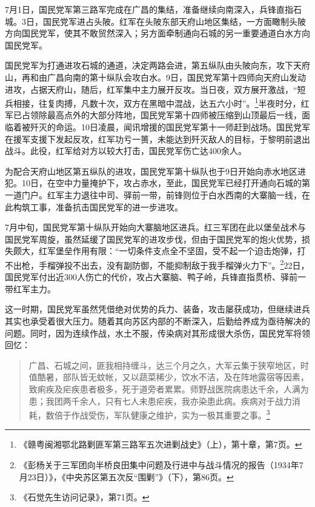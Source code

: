 7月1日，国民党军第三路军完成在广昌的集结，准备继续向南深入，兵锋直指石城。3日，国民党军进占头陂。红军在头陂东部天府山地区集结，一方面瞰制头陂方向国民党军，使其不敢贸然深入；另方面牵制通向石城的另一重要通道白水方向国民党军。


国民党军为打通进攻石城的通道，决定两路会进，第五纵队由头陂向东，攻下天府山，再和由广昌向南的第十纵队会攻白水。9日，国民党军第十四师向天府山发动进攻，占据天府山，随后，红军集中主力展开反攻。当日夜，双方展开激战，“短兵相接，往复肉搏，凡数十次，双方在黑暗中混战，达五六小时”。\footnote{《赣粤闽湘鄂北路剿匪军第三路军五次进剿战史》（上），第十章，第7页。}半夜时分，红军已占领除最高点外的大部分阵地，国民党军第十四师被压缩到山顶最后一线，面临着被歼灭的命运。10日凌晨，闻讯增援的国民党军第十一师赶到战场。国民党军在援军支援下发起反攻，红军功亏一篑，未能达到歼灭敌人的目标，于黎明前退出战斗。此役，红军给对方以较大打击，国民党军伤亡达400余人。


为配合天府山地区第五纵队的进攻，国民党军第十纵队也于9日开始向赤水地区进犯。10日，在空中力量掩护下，攻占赤水，至此，国民党军已经打开通向石城的第一道门户。红军主力退往中司、驿前一带，前锋则位于白水西南的大寨脑一线，在此构筑工事，准备抗击国民党军的进一步进攻。


7月中旬，国民党军第十纵队开始向大寨脑地区进兵。红三军团在此以堡垒战术与国民党军周旋，虽然延缓了国民党军的进攻步伐，但由于国民党军的炮火优势，损失颇大，红军堡垒作用有限：“一切条件支点全不坚固，受不起一个迫击炮弹，打不出枪，手榴弹投不出去，没有副防御，不能抑制敌于我手榴弹火力下”。\footnote{《彭杨关于三军团向半桥良田集中问题及行进中与战斗情况的报告（1934年7月23日）》，《中央苏区第五次反“围剿”》（下），第86页。}22日，国民党军付出近300人伤亡的代价，攻占大寨脑、鸭子岭，兵锋直指贯桥、驿前一带红军主力。


这一时期，国民党军虽然凭借绝对优势的兵力、装备，攻击屡获成功，但继续进兵其实也承受着很大压力。随着其向苏区内部的不断深入，后勤给养成为亟待解决的问题。同时，因为连续作战，水土不服，传染病对其形成很大杀伤，国民党军将领回忆：

\begin{quote}

广昌、石城之间，匪我相持缠斗，达三个月之久，大军云集于狭窄地区，时值酷暑，部队皆无蚊帐，又以蔬菜稀少，饮水不洁，及在阵地露宿等因素，致痢疾及疟疾患者极多，死于道旁者累累。师野战医院病患达千余，人满为患；我团两千余人，只有七人未患疟疾，我亦染患此病。疾病对于战力消耗，数倍于作战受伤，军队健康之维护，实为一极其重要之事。\footnote{《石觉先生访问记录》，第71页。}
\end{quote}


